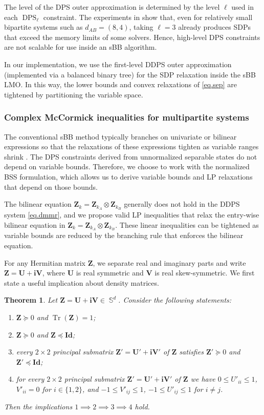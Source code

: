 \documentclass[smallextended]{svjour3}
\newtheorem{theorem}{Theorem}
\newcommand{\Z}{\mathbf{Z}}
\newcommand{\1}{\mathbf{1}}
\newcommand{\U}{\mathbf{U}}
\newcommand{\V}{\mathbf{V}}
\newcommand{\Id}{\mathbf{Id}}
\newcommand{\vi}{\mathbf{i}}
\DeclareMathOperator{\herm}{\mathbb{S}}
\DeclareMathOperator{\dps}{DPS}
\DeclareMathOperator{\tr}{Tr}
\DeclareMathOperator{\mtens}{\otimes}
\begin{document}
The level of the DPS outer approximation is determined by the level $\ell$ used in each $\dps_{\ell}$ constraint.   The experiments in  show that, even for relatively small bipartite systems such as $d_{AB}=(8,4)$, taking $\ell=3$ already produces SDPs that exceed the memory limits of some solvers. Hence, high-level DPS constraints are not scalable for use inside an sBB algorithm.

In our implementation, we use the first-level DDPS outer approximation (implemented via a balanced binary tree) for the SDP relaxation inside the sBB LMO.  In this way, the lower bounds and convex relaxations of \eqref{eq.sep} are tightened by partitioning the variable space.


\subsubsection{Complex McCormick inequalities for multipartite systems}
\label{subsec.complex}
\label{sec.rel3}
The conventional sBB method typically branches on univariate or bilinear expressions so that the relaxations of these expressions tighten as variable ranges shrink \cite{belotti2009branching}. The DPS constraints derived from unnormalized separable states do not depend on variable bounds. Therefore, we choose to work with the normalized BSS formulation, which allows us to derive variable bounds and LP relaxations that depend on those bounds.

 The bilinear equation $\Z_k = \Z_{k_A} \mtens \Z_{k_B}$ generally does not hold in the DDPS system \eqref{eq.dmmr}, and  we propose valid LP inequalities that relax the entry-wise bilinear equation in $\Z_k = \Z_{k_A} \mtens \Z_{k_B}$. These linear inequalities can be tightened as variable bounds are reduced by the branching rule that enforces the bilinear equation.

For any Hermitian matrix $\Z$, we separate real and imaginary parts and write $\Z = \U + \vi \V$, where $\U$ is real symmetric and $\V$ is real skew-symmetric. We first state a useful implication about density matrices.

\begin{theorem}
\label{thm.implication}
Let $\Z = \U + \vi \V \in \herm^d$. Consider the following statements:
\begin{enumerate}
    \item $\Z \succeq 0$ and $\tr(\Z) = 1$;
    \item $\Z \succeq 0$ and $\Z \preceq \Id$;
    \item every $2\times2$ principal submatrix $\Z' = \U' + \vi \V'$ of $\Z$ satisfies $\Z' \succeq 0$ and $\Z' \preceq \Id$;
    \item for every $2\times2$ principal submatrix $\Z' = \U' + \vi \V'$ of $\Z$ we have $0 \le U'_{ii} \le 1$, $V'_{ii} = 0$ for $i\in\{1,2\}$, and $-1 \le V'_{ij} \le 1$, $-1 \le U'_{ij} \le 1$ for $i\ne j$.
\end{enumerate}
Then the implications $1 \implies 2 \implies 3 \implies 4$ hold.
\end{theorem}
\end{document}
